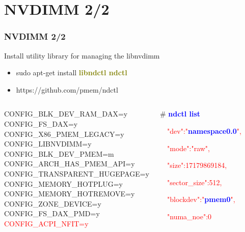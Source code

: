 \documentclass[aspectratio=169]{beamer}
\begin{document}
\section{NVDIMM 2/2}
\begin{frame}
\frametitle{NVDIMM 2/2}
{\LARGE Install utility library for managing the libnvdimm}
\begin{itemize}
\item {\large sudo apt-get install \textbf{\textcolor{olive}{libndctl ndctl}}}
\item {\large https://github.com/pmem/ndctl}
\end{itemize}
\begin{columns}[c]
\begin{block}{}
{ \small
CONFIG\_BLK\_DEV\_RAM\_DAX=y \\
CONFIG\_FS\_DAX=y \\
CONFIG\_X86\_PMEM\_LEGACY=y \\
CONFIG\_LIBNVDIMM=y \\
CONFIG\_BLK\_DEV\_PMEM=m \\
CONFIG\_ARCH\_HAS\_PMEM\_API=y \\
CONFIG\_TRANSPARENT\_HUGEPAGE=y \\
CONFIG\_MEMORY\_HOTPLUG=y \\
CONFIG\_MEMORY\_HOTREMOVE=y \\
CONFIG\_ZONE\_DEVICE=y \\
CONFIG\_FS\_DAX\_PMD=y  \\
\textcolor{red}{CONFIG\_ACPI\_NFIT=y}
}
\end{block}
\begin{block}{}
\# \textbf{\textcolor{blue}{ndctl list}}

{
\textcolor{red}{\ \  "dev":"\textbf{\textcolor{blue}{namespace0.0}}",}
	  
\textcolor{red}{\ \  "mode":"raw",}
  
\textcolor{red}{\ \  "size":17179869184,}
  
\textcolor{red}{\ \  "sector\_size":512,}
  
\textcolor{red}{\ \  "blockdev":"\textbf{\textcolor{blue}{pmem0}}",}
  
\textcolor{red}{\ \  "numa\_noe":0}

}
\end{block}
\end{columns}
\end{frame}

\end{document}
